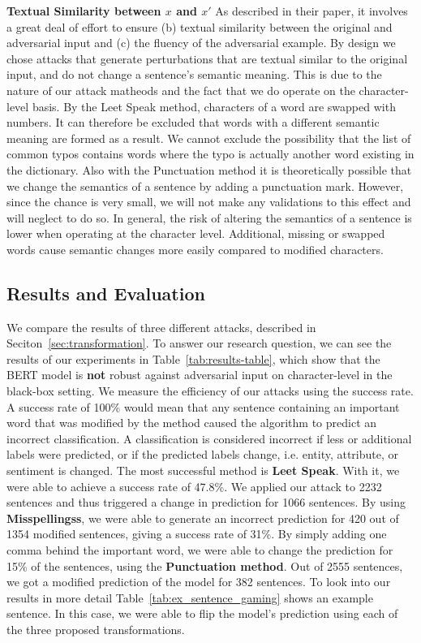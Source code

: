 \textbf{Textual Similarity between $x$ and $x'$}
As described in their paper, it involves a great deal of effort to ensure (b) textual similarity between the original and adversarial input and (c) the fluency of the adversarial example.
By design we chose attacks that generate perturbations that are textual similar to the original input, and do not change a sentence's semantic meaning. This is due to the nature of our attack matheods and the fact that we do operate on the character-level basis. By the Leet Speak method, characters of a word are swapped with numbers. It can therefore be excluded that words with a different semantic meaning are formed as a result. We cannot exclude the possibility that the list of common typos contains words where the typo is actually another word existing in the dictionary. 
Also with the Punctuation method it is theoretically possible that we change the semantics of a sentence by adding a punctuation mark. However, since the chance is very small, we will not make any validations to this effect and will neglect to do so. 
In general, the risk of altering the semantics of a sentence is lower when operating at the character level. Additional, missing or swapped words cause semantic changes more easily compared to modified characters. 


\subsection{Results and Evaluation}
We compare the results of three different attacks, described in Seciton~\ref{sec:transformation}. To answer our research question, we can see the results of our experiments in Table~\ref{tab:results-table}, which show that the BERT model is \textbf{not} robust against adversarial input on character-level in the black-box setting.
We measure the efficiency of our attacks using the success rate. 
A success rate of 100\% would mean that any sentence containing an important word that was modified by the method caused the algorithm to predict an incorrect classification. A classification is considered incorrect if less or additional labels were predicted, or if the predicted labels change, i.e. entity, attribute, or sentiment is changed.
The most successful method is \textbf{Leet Speak}. With it, we were able to achieve a success rate of 47.8\%. 
We applied our attack to 2232 sentences and thus triggered a change in prediction for 1066 sentences. By using \textbf{Misspellingss}, we were able to generate an incorrect prediction for 420 out of 1354 modified sentences, giving a success rate of 31\%. By simply adding one comma behind the important word, we were able to change the prediction for 15\% of the sentences, using the \textbf{Punctuation method}.  Out of 2555 sentences, we got a modified prediction of the model for 382 sentences.
To look into our results in more detail Table~\ref{tab:ex_sentence_gaming} shows an example sentence. In this case, we were able to flip the model's prediction using each of the three proposed transformations.

